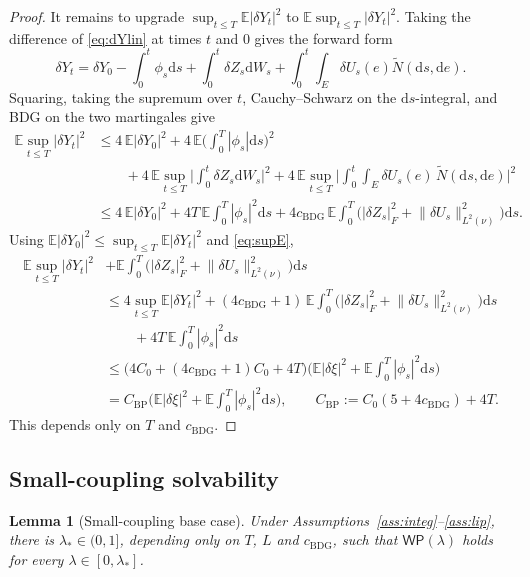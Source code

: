 \documentclass[preprint,12pt]{elsarticle}
\newcommand{\E}{\mathbb{E}}
\newcommand{\diff}{\mathrm{d}}
\newcommand{\Nt}{\widetilde{N}}
\newcommand{\Lnu}{L^2(\nu)}
\newcommand{\Lnorm}[1]{\lVert #1\rVert_{\Lnu}}
\numberwithin{equation}{section}
\theoremstyle{plain}
\newtheorem{lemma}[theorem]{Lemma}
\theoremstyle{definition}
\theoremstyle{\PaperRemarkStyle}
\begin{document}
\begin{proof}
It remains to upgrade $\sup_{t\le T}\E|\delta Y_t|^2$ to $\E\sup_{t\le T}|\delta Y_t|^2$. Taking the difference of
\eqref{eq:dYlin} at times $t$ and $0$ gives the forward form
\[
\delta Y_t=\delta Y_0-\int_0^t\phi_s\diff s+\int_0^t\delta Z_s\diff W_s+\int_0^t\!\int_E\delta U_s(e)\Nt(\diff s,\diff e) .
\]
Squaring, taking the supremum over $t$, Cauchy--Schwarz on the $\diff s$-integral, and BDG on
the two martingales give
\begin{align*}
\E\sup_{t\le T}|\delta Y_t|^2
&\le 4\,\E|\delta Y_0|^2+4\,\E\Big(\int_0^T\!|\phi_s|\diff s\Big)^{2}\\
&\qquad+4\,\E\sup_{t\le T}\Big|\int_0^t\!\delta Z_s\diff W_s\Big|^{2}
+4\,\E\sup_{t\le T}\Big|\int_0^t\!\!\int_E\delta U_s(e)\,\Nt(\diff s,\diff e)\Big|^{2}\\
&\le 4\,\E|\delta Y_0|^2+4T\,\E\!\int_0^T\!|\phi_s|^2\diff s
+4c_{\mathrm{BDG}}\,\E\!\int_0^T\!\big(|\delta Z_s|_F^2+\Lnorm{\delta U_s}^2\big)\diff s .
\end{align*}
Using $\E|\delta Y_0|^2\le\sup_{t\le T}\E|\delta Y_t|^2$ and \eqref{eq:supE},
\begin{align*}
\E\sup_{t\le T}|\delta Y_t|^2
&+\E\!\int_0^T\!\big(|\delta Z_s|_F^2+\Lnorm{\delta U_s}^2\big)\diff s\\
&\le 4\sup_{t\le T}\E|\delta Y_t|^2
+(4c_{\mathrm{BDG}}+1)\,\E\!\int_0^T\!\big(|\delta Z_s|_F^2+\Lnorm{\delta U_s}^2\big)\diff s\\
&\qquad+4T\,\E\!\int_0^T\!|\phi_s|^2\diff s\\
&\le\big(4C_0+(4c_{\mathrm{BDG}}+1)C_0+4T\big)
\Big(\E|\delta\xi|^2+\E\!\int_0^T\!|\phi_s|^2\diff s\Big)\\
&=C_{\mathrm{BP}}\Big(\E|\delta\xi|^2+\E\!\int_0^T\!|\phi_s|^2\diff s\Big),
\qquad C_{\mathrm{BP}}:=C_0(5+4c_{\mathrm{BDG}})+4T .
\end{align*}
This depends only on $T$ and $c_{\mathrm{BDG}}$.
\end{proof}

\subsection{Small-coupling solvability}

\begin{lemma}[Small-coupling base case]\label{lem:small}
Under Assumptions~\ref{ass:integ}--\ref{ass:lip}, there is $\lambda_*\in(0,1]$, depending only on $T$, $L$ and
$c_{\mathrm{BDG}}$, such that $\mathsf{WP}(\lambda)$ holds for
every $\lambda\in[0,\lambda_*]$.
\end{lemma}
\end{document}
